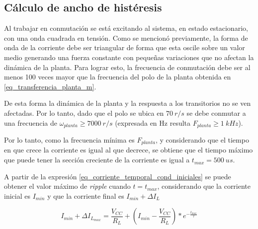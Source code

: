 \subsection{Cálculo de ancho de histéresis}


Al trabajar en conmutación se está excitando al sistema, en estado estacionario, con una onda cuadrada en tensión. Como se mencionó previamente, la forma de onda de la corriente debe ser triangular de forma que esta oscile sobre un valor medio generando una fuerza constante con pequeñas variaciones que no afectan la dinámica de la planta. Para lograr esto, la frecuencia de conmutación debe ser al menos 100 veces mayor que la frecuencia del polo de la planta obtenida en \ref{eq_transferencia_planta_m}. 

De esta forma la dinámica de la planta y la respuesta a los transitorios no se ven afectadas.  Por lo tanto, dado que el polo se ubica en $70\:r/s$  se debe conmutar a una frecuencia de $\omega_{planta}\geq7000\:r/s$ (expresada en Hz resulta $F_{planta}\geq1\:kHz$). 

Por lo tanto, como la frecuencia mínima es $F_{planta}$, y considerando que el tiempo en que crece la corriente es igual al que decrece, se obtiene que el tiempo máximo que puede tener la sección creciente de la corriente es igual a $t_{max}=500\:us$. 

A partir de la expresión \ref{eq_corriente_temporal_cond_iniciales} se puede obtener el valor máximo de \textsl{ripple} cuando $t=t_{max}$, considerando que la corriente inicial es $I_{min}$ y que la corriente final es $I_{min}+\Delta I_L$

\begin{equation} \label{eq_delta_i}
	I_{min}+\Delta I_{L_{max}}=\frac{V_{CC}}{R_L}+(I_{min}-\frac{V_{CC}}{R_L})*e^{-\frac{t_{max}}{\tau}}
\end{equation}

